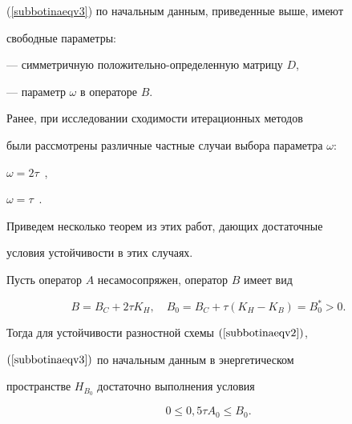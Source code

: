 (\ref{subbotinaeqv3}) по начальным данным, приведенные выше, имеют 


свободные параметры:





--- симметричную положительно-определенную матрицу $D$,





--- параметр $\omega$  в операторе $B$.





Ранее, при исследовании сходимости итерационных методов


были рассмотрены различные частные случаи выбора параметра $\omega$:


$\omega=2\tau$~\cite{subbotinabib11},


$\omega=\tau$~\cite{subbotinabib12}.





Приведем несколько теорем из этих работ, дающих достаточные 


условия устойчивости в этих случаях.





\begin{thm}


\label{subbotinateo2}


Пусть оператор $A$ несамосопряжен, оператор $B$ имеет вид


\begin{equation} \label{subbotinaeqv13}


B=B_C+2\tau K_H, \quad B_0=B_C+\tau \left({K_H - K_B} \right)


=B_0^* > 0.


\end{equation}


Тогда для устойчивости разностной схемы $(\ref{subbotinaeqv2})$,


$(\ref{subbotinaeqv3})$ по начальным данным в энергетическом 


пространстве $H_{B_0}$ достаточно выполнения условия


$$


0 \le 0{,}5\tau A_0 \le B_0.


$$


\end{thm}





